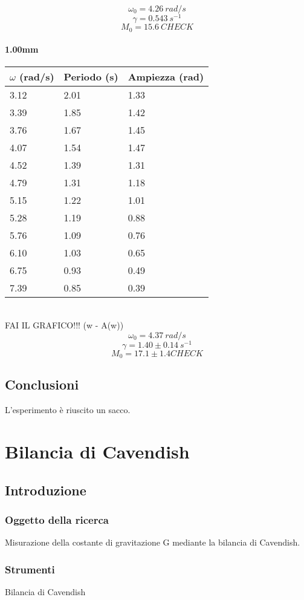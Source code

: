 \documentclass[a4paper,10pt]{report}
\begin{document}
$$ \omega_0 = 4.26\ rad/s $$
$$ \gamma = 0.543\ s^{-1} $$
$$ M_0 = 15.6\ CHECK $$


\subsubsection{1.00mm}
\begin{tabular}{l|l|l}
$\omega$ (rad/s) & Periodo (s) & Ampiezza (rad) \\
\midrule
3.12 & 2.01 & 1.33 \\
3.39 & 1.85 & 1.42 \\
3.76 & 1.67 & 1.45 \\
4.07 & 1.54 & 1.47 \\
4.52 & 1.39 & 1.31 \\
4.79 & 1.31 & 1.18 \\
5.15 & 1.22 & 1.01 \\
5.28 & 1.19 & 0.88 \\
5.76 & 1.09 & 0.76 \\
6.10 & 1.03 & 0.65 \\
6.75 & 0.93 & 0.49 \\
7.39 & 0.85 & 0.39 \\
\midrule
\end{tabular}
\\
FAI IL GRAFICO!!! (w - A(w))
\\

$$ \omega_0 = 4.37\ rad/s $$
$$ \gamma = 1.40 \pm 0.14\ s^{-1}$$
$$ M_0 = 17.1 \pm 1.4 CHECK $$
\section{Conclusioni}
L'esperimento è riuscito un sacco.


\chapter{Bilancia di Cavendish}
\section{Introduzione}
\subsection{Oggetto della ricerca}
Misurazione della costante di gravitazione G mediante la bilancia di Cavendish.
\subsection{Strumenti}
Bilancia di Cavendish\\
\end{document}
